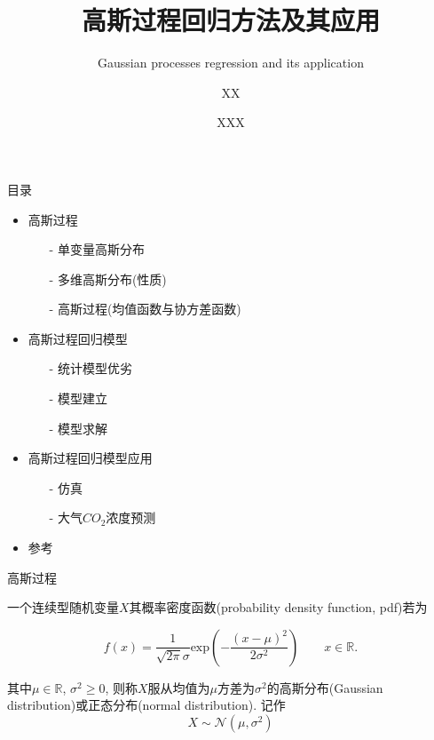 \documentclass[10pt,mathserif]{beamer}
\title{高斯过程回归方法及其应用}
\subtitle{Gaussian processes regression and its application}
\date{XXX}
\author{XX}
\theoremstyle{definition}
\numberwithin{equation}{section} %
\begin{document}
    \maketitle %

    \begin{frame}{目录}
        \begin{itemize}
            \item 高斯过程
            \begin{itemize}
                \item[-] 单变量高斯分布
                \item[-] 多维高斯分布(性质)
                \item[-] 高斯过程(均值函数与协方差函数)
            \end{itemize}

            \item 高斯过程回归模型
            \begin{itemize}
                \item[-] 统计模型优劣
                \item[-] 模型建立
                \item[-] 模型求解
            \end{itemize}

            \item 高斯过程回归模型应用
            \begin{itemize}
                \item[-] 仿真
                \item[-] 大气$CO_{2}$浓度预测
            \end{itemize}

            \item 参考
        \end{itemize}
    \end{frame}


    \begin{frame}[fragile]{高斯过程}
        \begin{definition}[高斯分布]
            \vspace{2ex}
            一个连续型随机变量$X$其概率密度函数(probability density function, pdf)若为
            
            \begin{equation}
                f(x)=\frac{1}{\sqrt{2\pi}\sigma}\mathrm{exp}\left(-\frac{(x-\mu)^2}{2\sigma^{2}}\right)\qquad x\in \mathds{R}. 
            \end{equation}

            其中$\mu\in\mathds{R}$, $\sigma^{2}\geqslant 0$, 则称$X$服从均值为$\mu$方差为$\sigma^{2}$的高斯分布(Gaussian distribution)或正态分布(normal distribution). 记作
            $$X\sim\mathcal{N}(\mu, \sigma^{2})$$
        \end{definition}
    \end{frame}
\end{document}
